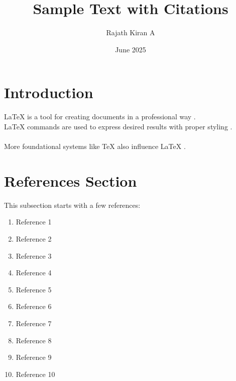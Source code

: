 \documentclass{article}
\title{Sample Text with Citations}
\author{Rajath Kiran A}
\date{June 2025}
\begin{document}
	\maketitle
	
	\section{Introduction}
	LaTeX is a tool for creating documents in a professional way \cite{useintroduction}.\\
	LaTeX commands are used to express desired results with proper styling \cite{kopka2003guide}.\\~\\
	More foundational systems like TeX also influence LaTeX \cite{lamport1994latex}.\\
	
	\section{References Section}
	This subsection starts with a few references:
	
	\begin{enumerate}
		\item Reference 1 \hspace{3cm} \cite{oetiker2005not}
		\item Reference 2 \hspace{3cm} \cite{goossens1993latex}
		\item Reference 3 \hspace{3cm} \cite{berry2001introduction}
		\item Reference 4 \hspace{3cm} \cite{wikibookslatex}
		\item Reference 5 \hspace{3cm} \cite{gratzer2007moremath}
		\item Reference 6 \hspace{3cm} \cite{kopka2003guide}
		\item Reference 7 \hspace{3cm} \cite{mittelbach2004latex}
		\item Reference 8 \hspace{3cm} \cite{knuth1984texbook}
		\item Reference 9 \hspace{3cm} \cite{lamport1994latex}
		\item Reference 10 \hspace{3cm} \cite{useintroduction}
	\end{enumerate}
	
	
	
\end{document}
